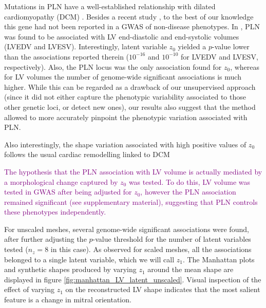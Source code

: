 Mutations in PLN have a well-established relationship with dilated cardiomyopathy (DCM) \cite{ref_Eijgenraam}. Besides a recent study \cite{ref_pirruccello}, to the best of our knowledge this gene had not been reported in a GWAS of non-disease phenotypes. In \cite{ref_pirruccello}, PLN was found to be associated with LV end-diastolic and end-systolic volumes (LVEDV and LVESV). Interestingly, latent variable $z_0$ yielded a $p$-value lower than the associations reported therein ($10^{-16}$ and $10^{-10}$ for LVEDV and LVESV, respectively). Also, the PLN locus was the only association found for $z_0$, whereas for LV volumes the number of genome-wide significant associations is much higher. 
While this can be regarded as a drawback of our unsupervised approach (since it did not either capture the phenotypic variability associated to those other genetic loci, or detect new ones), our results also suggest that the method allowed to more accurately pinpoint the phenotypic variation associated with PLN. 

Also interestingly, the shape variation associated with high positive values of $z_0$ follows the usual cardiac remodelling linked to DCM \cite{ref_dcm}

\textcolor{purple}{The hypothesis that the PLN association with LV volume is actually mediated by a morphological change captured by $z_0$ was tested. To do this, LV volume was tested in GWAS after being adjusted for $z_0$, however the PLN association remained significant (see supplementary material), suggesting that PLN controls these phenotypes independently.}

For unscaled meshes, several genome-wide significant associations were found, after further adjusting the $p$-value threshold for the number of latent variables tested ($n_z=8$ in this case). As observed for scaled meshes, all the associations belonged to a single latent variable, which we will call $z_1$. The Manhattan plots and synthetic shapes produced by varying $z_1$ around the mean shape are displayed in figure \ref{fig:manhattan_LV_latent_unscaled}. Visual inspection of the effect of varying $z_1$ on the reconstructed LV shape indicates that the most salient feature is a change in mitral orientation.

